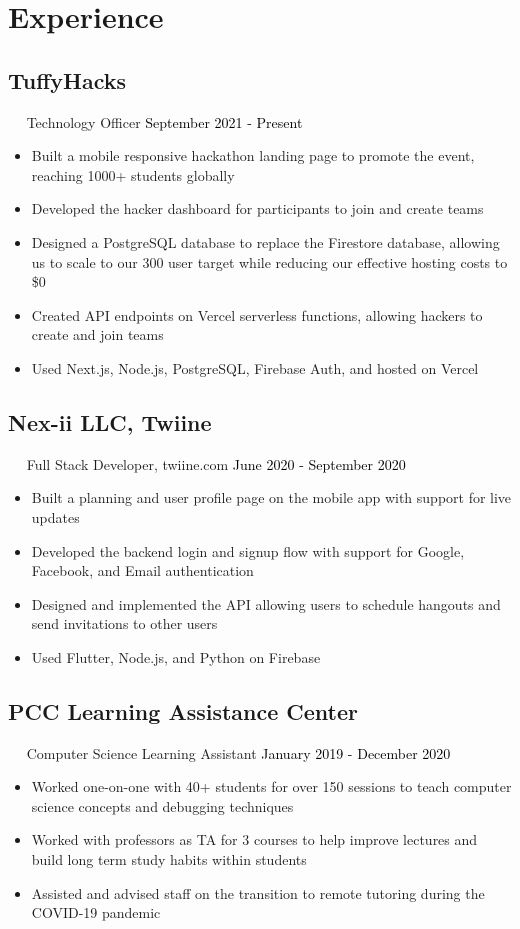 \documentclass{article}
\newcommand{\resumesection}[3]{
    \subsection*{#1}
    \ 
    \ 
    \small
    \textcolor{csufgrey}{#2}
    \normalsize
    \hfill
    \textcolor{black}{#3}
    \normalsize
}
\begin{document}
\section*{Experience}
\resumesection{TuffyHacks}{Technology Officer}{September 2021 - Present}
\begin{itemize}
    \item Built a mobile responsive hackathon landing page to promote the event, reaching 1000+ students globally 
    \item Developed the hacker dashboard for participants to join and create teams
    \item Designed a PostgreSQL database to replace the Firestore database, allowing us to scale to our 300 user target while reducing our effective hosting costs to \$0
    \item Created API endpoints on Vercel serverless functions, allowing hackers to create and join teams
    \item Used Next.js, Node.js, PostgreSQL, Firebase Auth, and hosted on Vercel
\end{itemize}
\resumesection{Nex-ii LLC, Twiine}{Full Stack Developer, twiine.com}{June 2020 - September 2020}
\begin{itemize}
    \item Built a planning and user profile page on the mobile app with support for live updates
    \item Developed the backend login and signup flow with support for Google, Facebook, and Email authentication
    \item Designed and implemented the API allowing users to schedule hangouts and send invitations to other users
    \item Used Flutter, Node.js, and Python on Firebase
\end{itemize}
\resumesection{PCC Learning Assistance Center}{Computer Science Learning Assistant}{January 2019 - December 2020}
\begin{itemize}
    \item Worked one-on-one with 40+ students for over 150 sessions to teach computer science concepts and debugging techniques
    \item Worked with professors as TA for 3 courses to help improve lectures and build long term study habits within students
    \item Assisted and advised staff on the transition to remote tutoring during the COVID-19 pandemic
\end{itemize}
\end{document}
